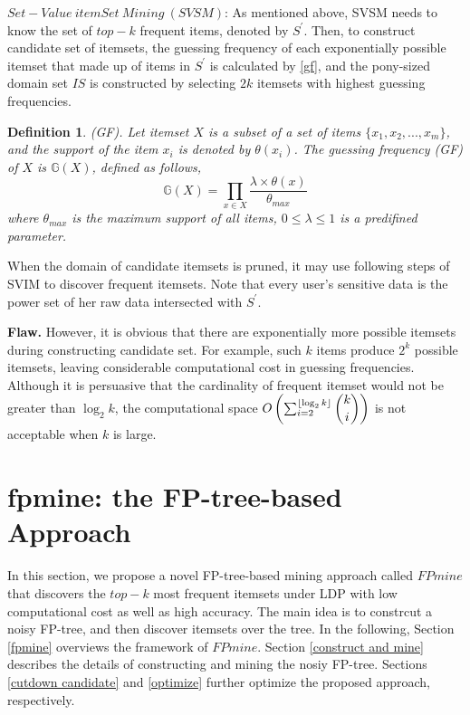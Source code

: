 \documentclass[conference]{IEEEtran}
\newtheorem{Definition}{\bf Definition}
\begin{document}

$Set-Value\ itemSet\ Mining\ (SVSM)$: As mentioned above, SVSM needs to know the set of $top-k$ frequent items, denoted by $S^{\prime}$. Then, to construct candidate set of itemsets, the guessing frequency of each  exponentially possible itemset that made up of items in $S^{\prime}$ is calculated by \eqref{gf}, and the pony-sized domain set $IS$ is constructed by selecting $2k$ itemsets with highest guessing frequencies.

\begin{Definition}
(GF). Let itemset $X$ is a subset of a set of items $\{{x_1,x_2,...,x_m} \}$, and the support of the item $x_i$ is denoted by $\theta(x_i)$. The guessing frequency (GF) of $X$ is $\mathbb{G}(X)$, defined as follows,\\
\begin{equation}
\mathbb{G}(X) = \prod_{x \in X} \frac{\lambda \times \theta(x)}{\theta_{max}} \label{gf}
\end{equation}
where $\theta_{max}$ is the maximum support of all items, $0 \leq \lambda \leq 1$ is a predifined parameter.

\end{Definition}

When the domain of candidate itemsets is pruned, it may use following steps of SVIM to discover frequent itemsets. Note that every user's sensitive data is the power set of her raw data intersected with $S^{\prime}$.

\textbf{Flaw.} However, it is obvious that there are exponentially more possible itemsets during constructing candidate set. For example, such $k$ items produce $2^{k}$ possible itemsets, leaving considerable computational cost in guessing frequencies. Although it is persuasive that the cardinality of frequent itemset would not be greater than $\log_{2} k$, the computational space $O\left(\sum_{i=2}^{\lfloor \log_{2}k \rfloor} \dbinom{k}{i} \right)$ is not acceptable when $k$ is large.

\section{fpmine: the FP-tree-based Approach}
In this section, we propose a novel FP-tree-based mining approach called $FPmine$ that discovers the $top-k$ most frequent itemsets under LDP with low computational cost as well as high accuracy. The main idea is to constrcut a noisy FP-tree, and then discover itemsets over the tree. In the following, Section \ref{fpmine} overviews the framework of $FPmine$. Section \ref{construct and mine} describes the details of constructing and mining the nosiy FP-tree. Sections \ref{cutdown candidate} and \ref{optimize} further optimize the proposed approach, respectively.
\end{document}
